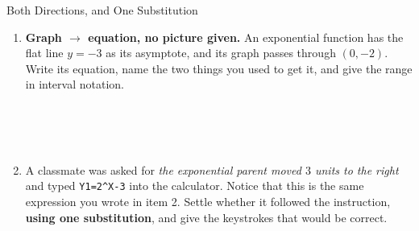 \documentclass[10pt]{article}
\begin{document}
\begin{notesbox}{Both Directions, and One Substitution}
\begin{enumerate}[leftmargin=1.6em, itemsep=7pt, topsep=4pt]
\item \textbf{Graph $\to$ equation, no picture given.} An exponential function has the flat line
$y=-3$ as its asymptote, and its graph passes through $(0,-2)$. Write its equation, name the two
things you used to get it, and give the range in interval notation.

\\
\\
\\

\item A classmate was asked for \emph{the exponential parent moved $3$ units to the right} and typed
\texttt{Y1=2\^{}X-3} into the calculator. Notice that this is the same expression you wrote in item
2. Settle whether it followed the instruction, \textbf{using one substitution}, and give the
keystrokes that would be correct.

\\
\\
\\

\end{enumerate}
\end{notesbox}
\end{document}
